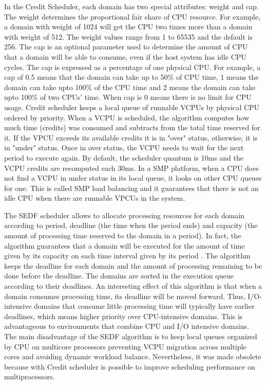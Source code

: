 In the Credit Scheduler, each domain has two special attributes: weight and cap. The weight determines the proportional fair share of CPU resource. For example, a domain with weight of 1024 will get the CPU two times more than a domain with weight of 512. The weight values range from 1 to 65535 and the default is 256. The cap is an optional parameter used to determine the amount of CPU that a domain will be able to consume, even if the host system has idle CPU cycles. The cap is expressed as a percentage of one physical CPU. For example, a cap of 0.5 means that the domain can take up to 50\% of CPU time, 1 means the domain can take upto 100\% of the CPU time and 2 means the domain can take upto 100\% of two CPUs' time. When cap is 0 means there is no limit for CPU usage.  Credit scheduler keeps a local queue of runnable VCPUs by physical CPU ordered by priority. When a VCPU is scheduled, the algorithm computes how much time (credits) was consumed and subtracts from the total time reserved for it. If the VPCU exceeds its available credits it is in "over" status, otherwise, it is in "under" status. Once in over status, the VCPU needs to wait for the next period to execute again. By default, the scheduler quantum is 10ms and the VCPU credits are recomputed each 30ms. In a SMP platform, when a CPU does not find a VCPU in under status in its local queue, it looks on other CPU queues for one. This is called SMP load balancing and it guarantees that there is not an idle CPU when there are runnable VPCUs in the system.

The SEDF scheduler allows to allocate processing resources for each domain according to period, deadline (the time when the period ends) and capacity (the amount of processing time reserved to the domain in a period). In fact, the algorithm guarantees that a domain will be executed for the amount of time given by its capacity on each time interval given by its period \cite{Ongaro2008}. The algorithm keeps the deadline for each domain and the amount of processing remaining to be done before the deadline. The domains are sorted in the execution queue according to their deadlines. An interesting effect of this algorithm is that when a domain consumes processing time, its deadline will be moved forward. Thus, I/O-intensive domains that consume little processing time will typically have earlier deadlines, which means higher priority over CPU-intensive domains. This is advantageous to environments that combine CPU and I/O intensive domains. The main disadvantage of the SEDF algorithm is to keep local queues organized by CPU on multicore processors preventing VCPU migration across multiple cores and avoiding dynamic workload balance. Nevertheless, it was made obsolete because with Credit scheduler is possible to improve scheduling performance on multiprocessors.


